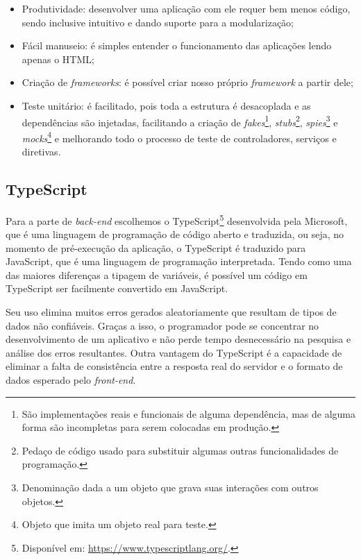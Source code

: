 \begin{itemize}
    \item Produtividade: desenvolver uma aplicação com ele requer bem menos código, sendo inclusive intuitivo e dando suporte para a modularização;
    \item Fácil manuseio: é simples entender o funcionamento das aplicações lendo apenas o HTML;
    \item Criação de \textit{frameworks}: é possível criar nosso próprio \textit{framework} a partir dele;
    \item Teste unitário: é facilitado, pois toda a estrutura é desacoplada e as dependências são injetadas, facilitando a criação de \textit{fakes}\footnote{São implementações reais e funcionais de alguma dependência, mas de alguma forma são incompletas para serem colocadas em produção.}, \textit{stubs}\footnote{Pedaço de código usado para substituir algumas outras funcionalidades de programação.}, \textit{spies}\footnote{Denominação dada a um objeto que grava suas interações com outros objetos.} e \textit{mocks}\footnote{Objeto que imita um objeto real para teste.} e melhorando todo o processo de teste de controladores, serviços e diretivas.
\end{itemize}

\subsection{TypeScript}
\label{ssec:TypeScript}
Para a parte de \textit{back-end} escolhemos o TypeScript\footnote{Disponível em: \url{https://www.typescriptlang.org/}.} desenvolvida pela Microsoft, que é uma linguagem de programação de código aberto e traduzida, ou seja, no momento de pré-execução da aplicação, o TypeScript é traduzido para JavaScript, que é uma linguagem de programação interpretada. Tendo como uma das maiores diferenças a tipagem de variáveis, é possível um código em TypeScript ser facilmente convertido em JavaScript. 

Seu uso elimina muitos erros gerados aleatoriamente que resultam de tipos de dados não confiáveis. Graças a isso, o programador pode se concentrar no desenvolvimento de um aplicativo e não perde tempo desnecessário na pesquisa e análise dos erros resultantes. Outra vantagem do TypeScript é a capacidade de eliminar a falta de consistência entre a resposta real do servidor e o formato de dados esperado pelo \textit{front-end}. \cite{Jakub2019TypeScript}

